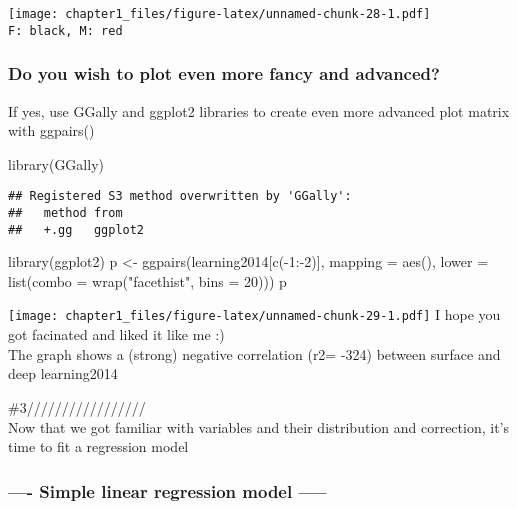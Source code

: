 \documentclass[
]{article}
\newenvironment{Shaded}{\begin{snugshade}}{\end{snugshade}}
\newcommand{\AttributeTok}[1]{\textcolor[rgb]{0.77,0.63,0.00}{#1}}
\newcommand{\DecValTok}[1]{\textcolor[rgb]{0.00,0.00,0.81}{#1}}
\newcommand{\FunctionTok}[1]{\textcolor[rgb]{0.00,0.00,0.00}{#1}}
\newcommand{\NormalTok}[1]{#1}
\newcommand{\OtherTok}[1]{\textcolor[rgb]{0.56,0.35,0.01}{#1}}
\newcommand{\SpecialCharTok}[1]{\textcolor[rgb]{0.00,0.00,0.00}{#1}}
\newcommand{\StringTok}[1]{\textcolor[rgb]{0.31,0.60,0.02}{#1}}
\begin{document}
\texttt{[image: chapter1\_files/figure-latex/unnamed-chunk-28-1.pdf]}
\texttt{F:\ black,\ M:\ red}

\hypertarget{do-you-wish-to-plot-even-more-fancy-and-advanced}{%
\subsubsection{Do you wish to plot even more fancy and
advanced?}\label{do-you-wish-to-plot-even-more-fancy-and-advanced}}

If yes, use GGally and ggplot2 libraries to create even more advanced
plot matrix with ggpairs()

\begin{Shaded}
\begin{Highlighting}[]
\FunctionTok{library}\NormalTok{(GGally)}
\end{Highlighting}
\end{Shaded}

\begin{verbatim}
## Registered S3 method overwritten by 'GGally':
##   method from   
##   +.gg   ggplot2
\end{verbatim}

\begin{Shaded}
\begin{Highlighting}[]
\FunctionTok{library}\NormalTok{(ggplot2)}
\NormalTok{p }\OtherTok{\textless{}{-}} \FunctionTok{ggpairs}\NormalTok{(learning2014[}\FunctionTok{c}\NormalTok{(}\SpecialCharTok{{-}}\DecValTok{1}\SpecialCharTok{:{-}}\DecValTok{2}\NormalTok{)], }\AttributeTok{mapping =} \FunctionTok{aes}\NormalTok{(), }\AttributeTok{lower =} \FunctionTok{list}\NormalTok{(}\AttributeTok{combo =} \FunctionTok{wrap}\NormalTok{(}\StringTok{"facethist"}\NormalTok{, }\AttributeTok{bins =} \DecValTok{20}\NormalTok{)))}
\NormalTok{p}
\end{Highlighting}
\end{Shaded}

\texttt{[image: chapter1\_files/figure-latex/unnamed-chunk-29-1.pdf]} I
hope you got facinated and liked it like me :)\\
The graph shows a (strong) negative correlation (r2= -324) between
surface and deep learning2014

\#3/////////////////\\
Now that we got familiar with variables and their distribution and
correction, it's time to fit a regression model

\hypertarget{simple-linear-regression-model}{%
\subsubsection{---- Simple linear regression model
-----}\label{simple-linear-regression-model}}
\end{document}
